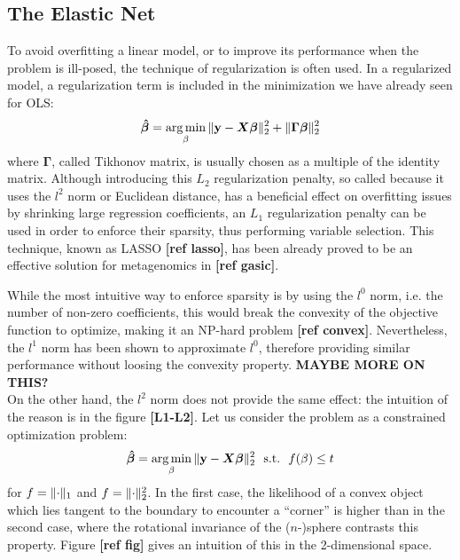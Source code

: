 \subsection{The Elastic Net}

To avoid overfitting a linear model, or to improve its performance when the problem is ill-posed, the technique of regularization is often used. In a regularized model, a regularization term is included in the minimization we have already seen for OLS:
\begin{equation*}
    \boldsymbol{\hat{\beta}} = \operatorname*{arg\,min}_{\beta}{\lVert\mathbf{y} - \boldsymbol{X}\boldsymbol{\beta}\rVert_2^2} + \lVert\boldsymbol{\Gamma}\boldsymbol{\beta}\rVert_2^2
\end{equation*}
where $\boldsymbol{\Gamma}$, called Tikhonov matrix, is usually chosen as a multiple of the identity matrix. Although introducing this $L_2$ regularization penalty, so called because it uses the $l^2$ norm or Euclidean distance, has a beneficial effect on overfitting issues by shrinking large regression coefficients, an $L_1$ regularization penalty can be used in order to enforce their sparsity, thus performing variable selection. This technique, known as LASSO \textbf{[ref lasso]}, has been already proved to be an effective solution for metagenomics in \textbf{[ref gasic]}.

While the most intuitive way to enforce sparsity is by using the $l^0$ norm, i.e. the number of non-zero coefficients, this would break the convexity of the objective function to optimize, making it an NP-hard problem \textbf{[ref convex]}. Nevertheless, the $l^1$ norm has been shown to approximate $l^0$, therefore providing similar performance without loosing the convexity property. \textbf{MAYBE MORE ON THIS?}\\
On the other hand, the $l^2$ norm does not provide the same effect: the intuition of the reason is in the figure \textbf{[L1-L2]}. Let us consider the problem as a constrained optimization problem:
\begin{equation*}
    \boldsymbol{\hat{\beta}} = \operatorname*{arg\,min}_{\beta}{\lVert\mathbf{y} - \boldsymbol{X}\boldsymbol{\beta}\rVert_2^2}~~\text{s.t.}~~f(\beta) \leq t
\end{equation*}
for $f=\lVert\cdot\rVert_1$ and $f=\lVert\cdot\rVert_2^2$. In the first case, the likelihood of a convex object which lies tangent to the boundary to encounter a ``corner'' is higher than in the second case, where the rotational invariance of the ($n$-)sphere contrasts this property. Figure \textbf{[ref fig]} gives an intuition of this in the 2-dimensional space.

